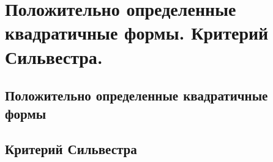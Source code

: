 \chapter{Положительно определенные квадратичные формы. Критерий Сильвестра.}
\section{Положительно определенные квадратичные формы}
\section{Критерий Сильвестра}
